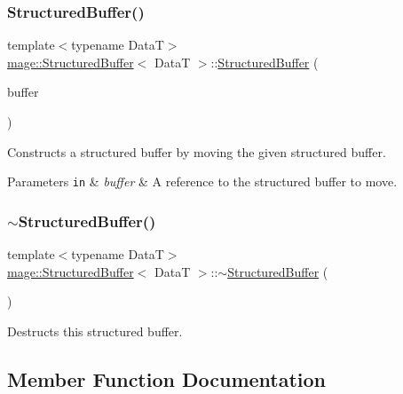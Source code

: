 \subsubsection{\texorpdfstring{Structured\+Buffer()}{StructuredBuffer()}\hspace{0.1cm}{\footnotesize\ttfamily [4/4]}}
{\footnotesize\ttfamily template$<$typename DataT$>$ \\
\hyperlink{structmage_1_1_structured_buffer}{mage\+::\+Structured\+Buffer}$<$ DataT $>$\+::\hyperlink{structmage_1_1_structured_buffer}{Structured\+Buffer} (\begin{DoxyParamCaption}\item[{\hyperlink{structmage_1_1_structured_buffer}{Structured\+Buffer}$<$ DataT $>$ \&\&}]{buffer }\end{DoxyParamCaption})\hspace{0.3cm}{\ttfamily [default]}}

Constructs a structured buffer by moving the given structured buffer.


\begin{DoxyParams}[1]{Parameters}
\mbox{\tt in}  & {\em buffer} & A reference to the structured buffer to move. \\
\hline
\end{DoxyParams}
\hypertarget{structmage_1_1_structured_buffer_a02ab1d322e1aef0c608b85224b80dbcf}{}\label{structmage_1_1_structured_buffer_a02ab1d322e1aef0c608b85224b80dbcf} 
\subsubsection{\texorpdfstring{$\sim$\+Structured\+Buffer()}{~StructuredBuffer()}}
{\footnotesize\ttfamily template$<$typename DataT$>$ \\
\hyperlink{structmage_1_1_structured_buffer}{mage\+::\+Structured\+Buffer}$<$ DataT $>$\+::$\sim$\hyperlink{structmage_1_1_structured_buffer}{Structured\+Buffer} (\begin{DoxyParamCaption}{ }\end{DoxyParamCaption})\hspace{0.3cm}{\ttfamily [default]}}

Destructs this structured buffer. 

\subsection{Member Function Documentation}
\hypertarget{structmage_1_1_structured_buffer_ad933738bc55b10aea665913a8215bab0}{}\label{structmage_1_1_structured_buffer_ad933738bc55b10aea665913a8215bab0} 
